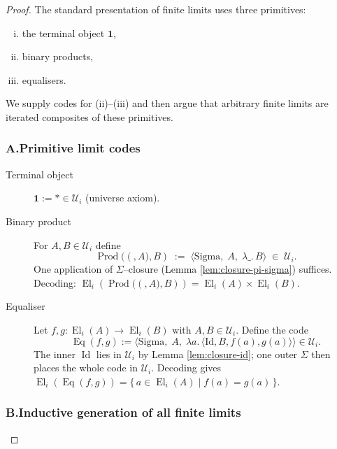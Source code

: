 \documentclass[a4paper,11pt]{article}
\newcommand{\El}{\operatorname{El}}          %
\newcommand{\Eq}{\operatorname{Eq}}          %
\newcommand{\Prod}[2]{\operatorname{Prod}\!\bigl(#1,#2\bigr)}
\begin{document}
\begin{proof}
The standard presentation of finite limits uses three primitives:

\begin{enumerate}[(i)]
  \item the terminal object $\mathbf 1$,
  \item binary products,
  \item equalisers.
\end{enumerate}

We supply codes for (ii)–(iii) and then argue that arbitrary finite
limits are iterated composites of these primitives.

\subsubsection*{A.\;Primitive limit codes}

\begin{description}
  \item[Terminal object]  $\mathbf 1:=\ast\in\mathcal U_{i}$
        (universe axiom).

  \item[Binary product]
        For $A,B\in\mathcal U_{i}$ define
        \[
          \Prod(A,B)\;:=\;
            \bigl\langle
               \mathrm{Sigma},\;
               A,\;
               \lambda\_ .\,B
             \bigr\rangle
          \;\in\;\mathcal U_{i}.
        \]
        One application of $\Sigma$–closure
        (Lemma \ref{lem:closure-pi-sigma}) suffices.
        Decoding: $\El_{i}(\Prod(A,B))=\El_{i}(A)\times\El_{i}(B)$.

  \item[Equaliser]
        Let $f,g:\El_{i}(A)\to\El_{i}(B)$ with $A,B\in\mathcal U_{i}$.
        Define the code
        \[
          \Eq(f,g)
            :=\bigl\langle
                 \mathrm{Sigma},\;
                 A,\;
                 \lambda a.\,
                   \langle\mathrm{Id},B,f(a),g(a)\rangle
               \bigr\rangle
            \in\mathcal U_{i}.
        \]
        The inner $\operatorname{Id}$ lies in $\mathcal U_{i}$ by
        Lemma \ref{lem:closure-id}; one outer $\Sigma$ then places the
        whole code in $\mathcal U_{i}$.  
        Decoding gives
        \(
          \El_{i}(\Eq(f,g))
            =\{\,a\in\El_{i}(A)\mid f(a)=g(a)\,\}.
        \)
\end{description}

\subsubsection*{B.\;Inductive generation of all finite limits}


\end{proof}
\end{document}
